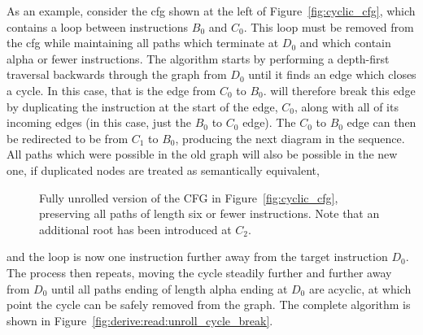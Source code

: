 As an example, consider the \gls{cfg} shown at the left of
Figure~\ref{fig:cyclic_cfg}, which contains a loop between
instructions $B_0$ and $C_0$.  This loop must be removed from the
\gls{cfg} while maintaining all paths which terminate at $D_0$ and
which contain \gls{alpha} or fewer instructions.  The algorithm starts
by performing a depth-first traversal backwards through the graph from
$D_0$ until it finds an edge which closes a cycle.  In this case, that
is the edge from $C_0$ to $B_0$.  {\Technique} will therefore break
this edge by duplicating the instruction at the start of the edge,
$C_0$, along with all of its incoming edges (in this case, just the
$B_0$ to $C_0$ edge).  The $C_0$ to $B_0$ edge can then be redirected
to be from $C_1$ to $B_0$, producing the next diagram in the sequence.
All paths which were possible in the old graph will also be possible
in the new one, if duplicated nodes are treated as semantically
equivalent,
\begin{wrapfigure}{r}{3.3cm}
\vspace{-3mm}
\caption{Fully unrolled version of the CFG in
  Figure~\ref{fig:cyclic_cfg}, preserving all paths of length six or
  fewer instructions.  Note that an additional root has been
  introduced at $C_2$.}
\label{fig:unrolled_cyclic_cfg}
\vspace{-20pt}
\end{wrapfigure}
and the loop is now one instruction further away from the
target instruction $D_0$.  The process then repeats, moving the cycle
steadily further and further away from $D_0$ until all paths ending of
length \gls{alpha} ending at $D_0$ are acyclic, at which point the
cycle can be safely removed from the graph.  The complete algorithm is
shown in Figure~\ref{fig:derive:read:unroll_cycle_break}.

